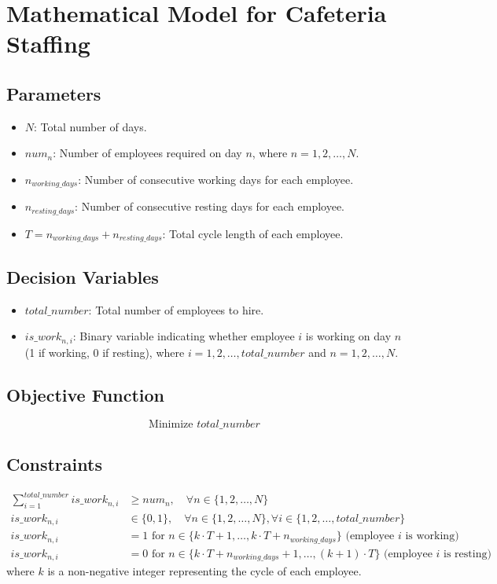 \documentclass{article}
\begin{document}
\section*{Mathematical Model for Cafeteria Staffing}

\subsection*{Parameters}
\begin{itemize}
    \item $N$: Total number of days.
    \item $num_n$: Number of employees required on day $n$, where $n = 1, 2, \ldots, N$.
    \item $n_{working\_days}$: Number of consecutive working days for each employee.
    \item $n_{resting\_days}$: Number of consecutive resting days for each employee.
    \item $T = n_{working\_days} + n_{resting\_days}$: Total cycle length of each employee.
\end{itemize}

\subsection*{Decision Variables}
\begin{itemize}
    \item $total\_number$: Total number of employees to hire.
    \item $is\_work_{n,i}$: Binary variable indicating whether employee $i$ is working on day $n$ (1 if working, 0 if resting), where $i = 1, 2, \ldots, total\_number$ and $n = 1, 2, \ldots, N$.
\end{itemize}

\subsection*{Objective Function}
\[
\text{Minimize } total\_number
\]

\subsection*{Constraints}
\begin{align}
\sum_{i=1}^{total\_number} is\_work_{n,i} & \geq num_n, \quad \forall n \in \{1, 2, \ldots, N\} \\
is\_work_{n,i} & \in \{0, 1\}, \quad \forall n \in \{1, 2, \ldots, N\}, \forall i \in \{1, 2, \ldots, total\_number\} \\
is\_work_{n,i} & = 1 \text{ for } n \in \{k\cdot T + 1, \ldots, k\cdot T + n_{working\_days}\} \text{ (employee $i$ is working)} \\
is\_work_{n,i} & = 0 \text{ for } n \in \{k\cdot T + n_{working\_days} + 1, \ldots, (k+1)\cdot T\} \text{ (employee $i$ is resting)}
\end{align}
where $k$ is a non-negative integer representing the cycle of each employee.
\end{document}
